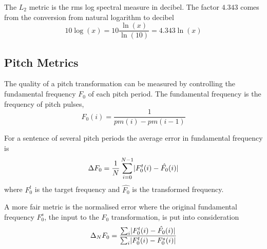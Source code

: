 \begin{remark}
	The $L_2$ metric is the rms log spectral measure in decibel. The factor $4.343$ comes from the conversion from natural logarithm to decibel
	\begin{equation}
		10\log(x) = 10 \frac{\ln(x)}{\ln(10)} = 4.343\ln(x) 
	\end{equation}	
\end{remark}


\subsection{Pitch Metrics} %
\label{sub:pitch_metrics}
The quality of a pitch transformation can be measured by controlling the fundamental frequency $F_0$ of each pitch period. The fundamental frequency is the frequency of pitch pulses, \ie 
\begin{equation}
	F_0(i) = \frac{1}{pm(i)-pm(i-1)}
\end{equation}

For a sentence of several pitch periods the average error in fundamental frequency is
\begin{equation}
	\Delta F_0 = \frac{1}{N}\sum_{i=0}^{N-1} \lvert F_0^t(i) - \hat{F_0}(i)\rvert
\end{equation}
where $F_0^t$ is the target frequency and $\hat{F_0}$ is the transformed frequency.

A more fair metric is the normalised error where the original fundamental frequency $F_0^s$, the input to the $F_0$ transformation, is put into consideration
\begin{equation}
	\Delta_N F_0 = \frac{\sum_{i} \lvert F_0^t (i)- \hat{F_0} (i)\rvert}{\sum_{i} \lvert F_0^t (i)-F_0^s (i)\rvert}
\end{equation}



